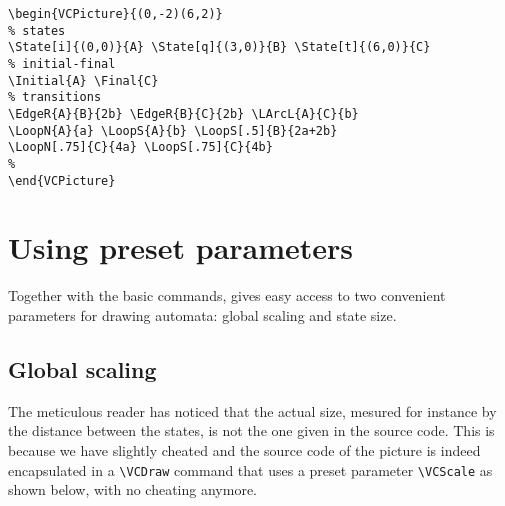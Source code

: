 \documentclass[11pt,twoside]{article}
\newlength{\parindenttemp} %
\newcommand{\noi}{\noindent}
\newlength{\jsIndent}%
\newlength{\ColSource}%
\newlength{\ColFigur}%
\begin{document}
\noi 
\hspace*{-\jsIndent}
\begin{minipage}[t]{\ColFigur}%
\par\vspace*{0mm}%
\bigskip 
\begin{center}
%
\end{center}
\end{minipage}%
\hspace*{1.2em}%
\begin{minipage}[t]{\ColSource}
\setlength{\parindent}{\parindenttemp}%
\par\vspace*{0mm}%
\footnotesize
\begin{verbatim}
\begin{VCPicture}{(0,-2)(6,2)}
% states
\State[i]{(0,0)}{A} \State[q]{(3,0)}{B} \State[t]{(6,0)}{C}
% initial-final
\Initial{A} \Final{C}
% transitions 
\EdgeR{A}{B}{2b} \EdgeR{B}{C}{2b} \LArcL{A}{C}{b}
\LoopN{A}{a} \LoopS{A}{b} \LoopS[.5]{B}{2a+2b} 
\LoopN[.75]{C}{4a} \LoopS[.75]{C}{4b}
%
\end{VCPicture}
\end{verbatim}
\normalsize
\end{minipage}%


\section{Using preset parameters}\label{sec.pre}

Together with the basic commands, \VCSG gives easy access to two convenient
parameters for drawing automata: global scaling and state size.

\subsection{Global scaling}\label{subsec.sca}

The meticulous reader has noticed that the actual size, mesured for 
instance by the distance between the states, is not the one given in 
the source code.
This is because we have slightly cheated and the source code of the 
picture is indeed encapsulated in a \verb+\VCDraw+ command that uses 
a preset parameter \verb+\VCScale+ as shown below, with no 
cheating anymore.
\end{document}
